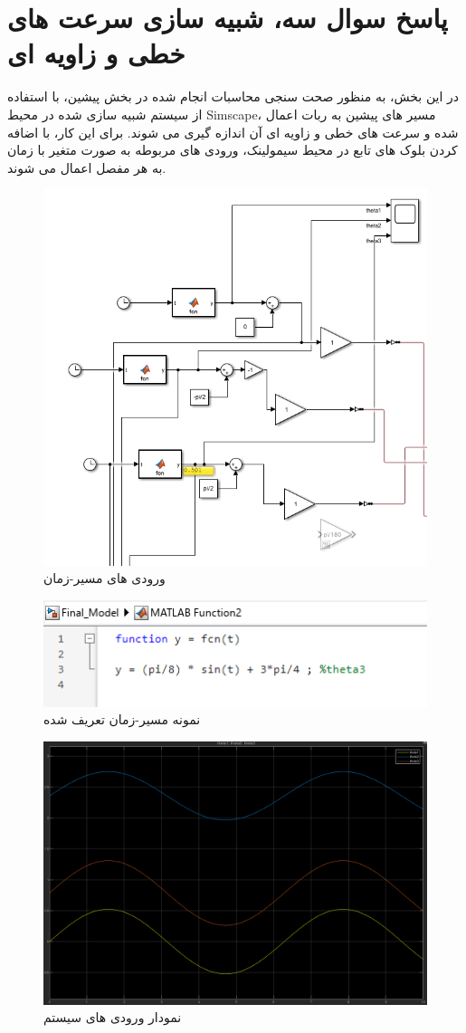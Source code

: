 \section*{پاسخ سوال سه، شبیه سازی سرعت های خطی و زاویه ای}
در این بخش، به منظور صحت سنجی محاسبات انجام شده در بخش پیشین، با استفاده از سیستم شبیه سازی شده در محیط Simscape، مسیر های پیشین به ربات اعمال شده و سرعت های خطی و زاویه ای آن اندازه گیری می شوند.
برای این کار، با اضافه کردن بلوک های تابع در محیط سیمولینک، ورودی های مربوطه به صورت متغیر با زمان به هر مفصل اعمال می شوند. 
\begin{figure}[[H]
	\centering
	\includegraphics[width=0.6\linewidth]{../img/input}
	\caption{ورودی های مسیر-زمان}
	\label{fig:input}
\end{figure}
\begin{figure}[htbp]
	\centering
	\includegraphics[width=0.7\linewidth]{../img/input_matlab_function_example}
	\caption{نمونه مسیر-زمان تعریف شده}
	\label{fig:inputmatlabfunctionexample}
\end{figure}
\begin{figure}[htbp]
	\centering
	\includegraphics[width=0.7\linewidth]{../img/input_scop}
	\caption{نمودار ورودی های سیستم}
	\label{fig:inputscop}
\end{figure}
